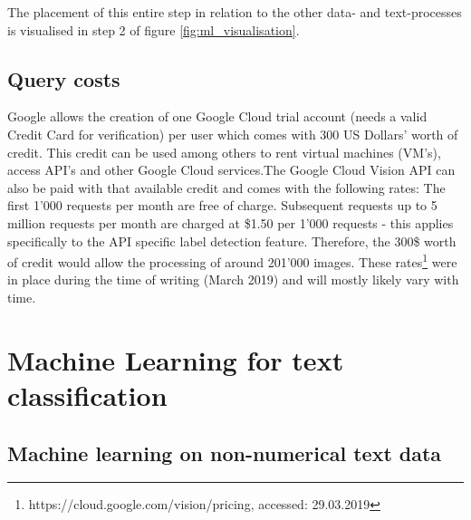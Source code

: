 The placement of this entire step in relation to the other data- and text-processes is visualised in step 2 of figure \ref{fig:ml_visualisation}.

\subsection{Query costs} \label{vision_query_cost}
Google allows the creation of one Google Cloud trial account (needs a valid Credit Card for verification) per user which comes with 300 US Dollars' worth of credit. This credit can be used among others to rent virtual machines (VM's), access API's and other Google Cloud services.The Google Cloud Vision API can also be paid with that available credit and comes with the following rates: The first 1'000 requests per month are free of charge. Subsequent requests up to 5 million requests per month are charged at \$1.50 per 1'000 requests - this applies specifically to the API specific label detection feature. Therefore, the 300\$ worth of credit would allow the processing of around 201'000 images. These rates\footnote{https://cloud.google.com/vision/pricing, accessed: 29.03.2019} were in place during the time of writing (March 2019) and will mostly likely vary with time.

\clearpage

\section{Machine Learning for text classification} 

\subsection{Machine learning on non-numerical text data} \label{ml_text_data}

